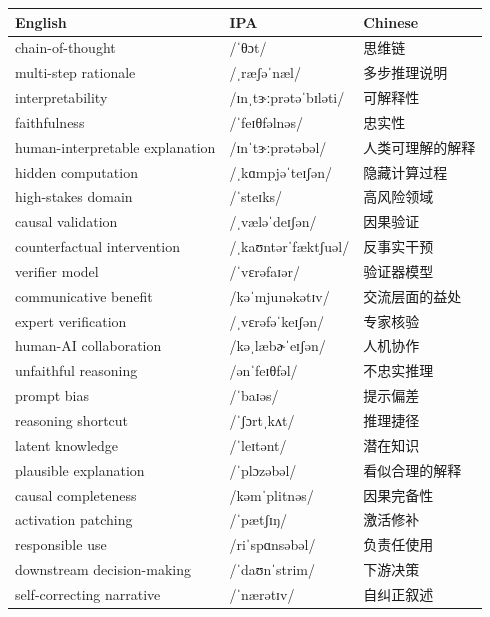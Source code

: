 \documentclass[UTF8,12pt,a4paper]{ctexart}
\providecommand{\zh}[1]{#1}
\begin{document}
\begin{tabular*}{\textwidth}{@{\extracolsep{\fill}}lll@{}}
\toprule
\textbf{English} & \textbf{IPA} & \textbf{Chinese} \\
\midrule
chain-of-thought & {\ipafont /ˈθɔt/} & \zh{思维链} \\
multi-step rationale & {\ipafont /ˌræʃəˈnæl/} & \zh{多步推理说明} \\
interpretability & {\ipafont /ɪnˌtɝːprətəˈbɪləti/} & \zh{可解释性} \\
faithfulness & {\ipafont /ˈfeɪθfəlnəs/} & \zh{忠实性} \\
human-interpretable explanation & {\ipafont /ɪnˈtɝːprətəbəl/} & \zh{人类可理解的解释} \\
hidden computation & {\ipafont /ˌkɑmpjəˈteɪʃən/} & \zh{隐藏计算过程} \\
high-stakes domain & {\ipafont /ˈsteɪks/} & \zh{高风险领域} \\
causal validation & {\ipafont /ˌvæləˈdeɪʃən/} & \zh{因果验证} \\
counterfactual intervention & {\ipafont /ˌkaʊntərˈfæktʃuəl/} & \zh{反事实干预} \\
verifier model & {\ipafont /ˈvɛrəfaɪər/} & \zh{验证器模型} \\
communicative benefit & {\ipafont /kəˈmjunəkətɪv/} & \zh{交流层面的益处} \\
expert verification & {\ipafont /ˌvɛrəfəˈkeɪʃən/} & \zh{专家核验} \\
human-AI collaboration & {\ipafont /kəˌlæbɚˈeɪʃən/} & \zh{人机协作} \\
unfaithful reasoning & {\ipafont /ənˈfeɪθfəl/} & \zh{不忠实推理} \\
prompt bias & {\ipafont /ˈbaɪəs/} & \zh{提示偏差} \\
reasoning shortcut & {\ipafont /ˈʃɔrtˌkʌt/} & \zh{推理捷径} \\
latent knowledge & {\ipafont /ˈleɪtənt/} & \zh{潜在知识} \\
plausible explanation & {\ipafont /ˈplɔzəbəl/} & \zh{看似合理的解释} \\
causal completeness & {\ipafont /kəmˈplitnəs/} & \zh{因果完备性} \\
activation patching & {\ipafont /ˈpætʃɪŋ/} & \zh{激活修补} \\
responsible use & {\ipafont /riˈspɑnsəbəl/} & \zh{负责任使用} \\
downstream decision-making & {\ipafont /ˈdaʊnˈstrim/} & \zh{下游决策} \\
self-correcting narrative & {\ipafont /ˈnærətɪv/} & \zh{自纠正叙述} \\

\end{tabular*}
\end{document}
